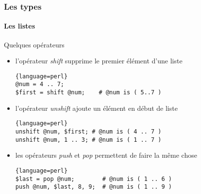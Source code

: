 \begin{frame}[fragile]
  \frametitle{Les types}
  \framesubtitle{Les listes}

  \begin{exampleblock}{Quelques opérateurs}
    \begin{itemize}
    \item l'opérateur \textit{shift} supprime le premier élément d'une liste
      \begin{lstlisting}{language=perl}
@num = 4 .. 7;
$first = shift @num;    # @num is ( 5..7 )
      \end{lstlisting}
    \item l'opérateur \textit{unshift} ajoute un élément en début de liste
      \begin{lstlisting}{language=perl}
unshift @num, $first; # @num is ( 4 .. 7 )
unshift @num, 1 .. 3; # @num is ( 1 .. 7 )
      \end{lstlisting}
    \item les opérateurs \textit{push} et \textit{pop} permettent de faire la
      même chose
      \begin{lstlisting}{language=perl}
$last = pop @num;        # @num is ( 1 .. 6 )
push @num, $last, 8, 9;  # @num is ( 1 .. 9 )
      \end{lstlisting}
    \end{itemize}
  \end{exampleblock}

\end{frame}

